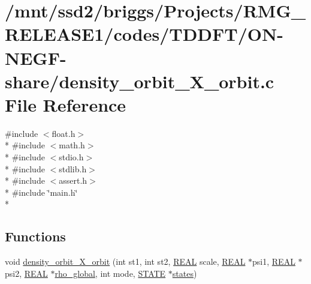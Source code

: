 \hypertarget{_t_d_d_f_t_2_o_n-_n_e_g_f-share_2density__orbit___x__orbit_8c}{\section{/mnt/ssd2/briggs/\-Projects/\-R\-M\-G\-\_\-\-R\-E\-L\-E\-A\-S\-E1/codes/\-T\-D\-D\-F\-T/\-O\-N-\/\-N\-E\-G\-F-\/share/density\-\_\-orbit\-\_\-\-X\-\_\-orbit.c File Reference}
\label{_t_d_d_f_t_2_o_n-_n_e_g_f-share_2density__orbit___x__orbit_8c}
}
{\ttfamily \#include $<$float.\-h$>$}\\*
{\ttfamily \#include $<$math.\-h$>$}\\*
{\ttfamily \#include $<$stdio.\-h$>$}\\*
{\ttfamily \#include $<$stdlib.\-h$>$}\\*
{\ttfamily \#include $<$assert.\-h$>$}\\*
{\ttfamily \#include \char`\"{}main.\-h\char`\"{}}\\*
\subsection*{Functions}
\begin{DoxyCompactItemize}
\item 
void \hyperlink{_t_d_d_f_t_2_o_n-_n_e_g_f-share_2density__orbit___x__orbit_8c_ae67db5960e2363d8244eb58ba852ded1}{density\-\_\-orbit\-\_\-\-X\-\_\-orbit} (int st1, int st2, \hyperlink{md_8h_a4b654506f18b8bfd61ad2a29a7e38c25}{R\-E\-A\-L} scale, \hyperlink{md_8h_a4b654506f18b8bfd61ad2a29a7e38c25}{R\-E\-A\-L} $\ast$psi1, \hyperlink{md_8h_a4b654506f18b8bfd61ad2a29a7e38c25}{R\-E\-A\-L} $\ast$psi2, \hyperlink{md_8h_a4b654506f18b8bfd61ad2a29a7e38c25}{R\-E\-A\-L} $\ast$\hyperlink{overlap_8h_a27883065e72831cd70385a5959eba4de}{rho\-\_\-global}, int mode, \hyperlink{struct_s_t_a_t_e}{S\-T\-A\-T\-E} $\ast$\hyperlink{md_8h_a286ebf6b996d2b1827eb9a889dfc83d7}{states})
\end{DoxyCompactItemize}


